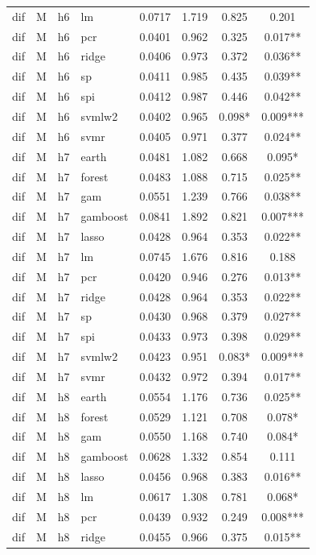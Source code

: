 \begin{ThreePartTable}
\begin{longtable}[t]{llclcccc}
dif & M & h6 & lm & 0.0717 & 1.719 & 0.825 & 0.201\\
dif & M & h6 & pcr & 0.0401 & 0.962 & 0.325 & 0.017**\\
dif & M & h6 & ridge & 0.0406 & 0.973 & 0.372 & 0.036**\\
dif & M & h6 & sp & 0.0411 & 0.985 & 0.435 & 0.039**\\
dif & M & h6 & spi & 0.0412 & 0.987 & 0.446 & 0.042**\\
dif & M & h6 & svmlw2 & 0.0402 & 0.965 & 0.098* & 0.009***\\
dif & M & h6 & svmr & 0.0405 & 0.971 & 0.377 & 0.024**\\
\addlinespace
dif & M & h7 & earth & 0.0481 & 1.082 & 0.668 & 0.095*\\
dif & M & h7 & forest & 0.0483 & 1.088 & 0.715 & 0.025**\\
dif & M & h7 & gam & 0.0551 & 1.239 & 0.766 & 0.038**\\
dif & M & h7 & gamboost & 0.0841 & 1.892 & 0.821 & 0.007***\\
dif & M & h7 & lasso & 0.0428 & 0.964 & 0.353 & 0.022**\\
dif & M & h7 & lm & 0.0745 & 1.676 & 0.816 & 0.188\\
dif & M & h7 & pcr & 0.0420 & 0.946 & 0.276 & 0.013**\\
dif & M & h7 & ridge & 0.0428 & 0.964 & 0.353 & 0.022**\\
dif & M & h7 & sp & 0.0430 & 0.968 & 0.379 & 0.027**\\
dif & M & h7 & spi & 0.0433 & 0.973 & 0.398 & 0.029**\\
dif & M & h7 & svmlw2 & 0.0423 & 0.951 & 0.083* & 0.009***\\
dif & M & h7 & svmr & 0.0432 & 0.972 & 0.394 & 0.017**\\
\addlinespace
dif & M & h8 & earth & 0.0554 & 1.176 & 0.736 & 0.025**\\
dif & M & h8 & forest & 0.0529 & 1.121 & 0.708 & 0.078*\\
dif & M & h8 & gam & 0.0550 & 1.168 & 0.740 & 0.084*\\
dif & M & h8 & gamboost & 0.0628 & 1.332 & 0.854 & 0.111\\
dif & M & h8 & lasso & 0.0456 & 0.968 & 0.383 & 0.016**\\
dif & M & h8 & lm & 0.0617 & 1.308 & 0.781 & 0.068*\\
dif & M & h8 & pcr & 0.0439 & 0.932 & 0.249 & 0.008***\\
dif & M & h8 & ridge & 0.0455 & 0.966 & 0.375 & 0.015**\\

\end{longtable}
\end{ThreePartTable}
